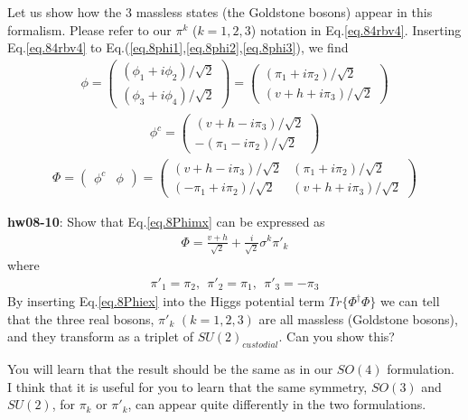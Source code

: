 \documentclass[12pt]{article}
\begin{document}
  Let us show how the 3 massless states (the Goldstone bosons) appear
  in this formalism.  Please refer to our $\pi^k$ ($k=1,2,3$) notation
  in Eq.\ref{eq.84rbv4}.  Inserting Eq.\ref{eq.84rbv4} to Eq.(\ref{eq.8phi1},\ref{eq.8phi2},\ref{eq.8phi3}), we find
\begin{eqnarray}
  \phi= 
  \begin{pmatrix}
    (\phi_1 + i\phi_2)/\sqrt{2} \\
    (\phi_3 + i\phi_4)/\sqrt{2} 
  \end{pmatrix}
  =
  \begin{pmatrix}
    (\pi_1  + i\pi_2)/\sqrt{2} \\
    (v + h  + i\pi_3)/\sqrt{2}
  \end{pmatrix}
\end{eqnarray}
\begin{eqnarray}
  \phi^c =
  \begin{pmatrix}
    (v + h - i\pi_3)/\sqrt{2} \\
    -(\pi_1 - i\pi_2)/\sqrt{2} 
  \end{pmatrix}
\end{eqnarray}
\begin{eqnarray}
  \Phi =
  \begin{pmatrix}
    \phi^c & \phi
  \end{pmatrix}
  =
  \begin{pmatrix}
    ( v + h -i\pi_3)/\sqrt{2} & (\pi_1 + i\pi_2)/\sqrt{2} \\
    (-\pi_1 +i\pi_2)/\sqrt{2} & ( v + h +i\pi_3)/\sqrt{2}
  \end{pmatrix} \label{eq.8Phimx}
\end{eqnarray}

{\bf hw08-10}: Show that Eq.\ref{eq.8Phimx} can be expressed as
\begin{eqnarray}
  \Phi = \frac{v+h}{\sqrt{2}} + \frac{i}{\sqrt 2} \sigma^k \pi'_k \label{eq.8Phiex}
\end{eqnarray}
 where
\begin{eqnarray}
  \pi'_1 = \pi_2,~~\pi'_2 = \pi_1,~~\pi'_3 = -\pi_3
\end{eqnarray}
  By inserting Eq.\ref{eq.8Phiex} into the Higgs potential term $Tr\{ \Phi^\dagger \Phi \}$
  we can tell that the three real bosons, $\pi'_k$ $(k=1,2,3)$ are all
  massless (Goldstone bosons), and they transform as a triplet of
  $SU(2)_{custodial}$. Can you show this?

  You will learn that the result should be the same as in our $SO(4)$
  formulation. I think that it is useful for you to learn that the
  same symmetry, $SO(3)$ and $SU(2)$, for $\pi_k$ or $\pi'_k$, can appear
  quite differently in the two formulations.
\end{document}
